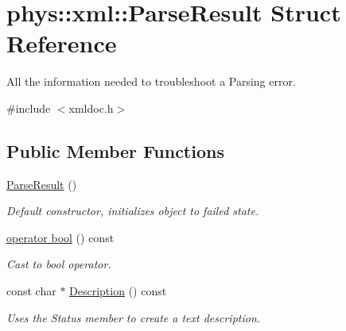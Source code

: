 \hypertarget{structphys_1_1xml_1_1ParseResult}{
\section{phys::xml::ParseResult Struct Reference}
\label{d5/dea/structphys_1_1xml_1_1ParseResult}
}


All the information needed to troubleshoot a Parsing error.  




{\ttfamily \#include $<$xmldoc.h$>$}

\subsection*{Public Member Functions}
\begin{DoxyCompactItemize}
\item 
\hypertarget{structphys_1_1xml_1_1ParseResult_aa7520df050e866122a0cf67bf306e323}{
\hyperlink{structphys_1_1xml_1_1ParseResult_aa7520df050e866122a0cf67bf306e323}{ParseResult} ()}
\label{d5/dea/structphys_1_1xml_1_1ParseResult_aa7520df050e866122a0cf67bf306e323}

\begin{DoxyCompactList}\small\item\em Default constructor, initializes object to failed state. \item\end{DoxyCompactList}\item 
\hyperlink{structphys_1_1xml_1_1ParseResult_a95c9989865c1bace7846995166a13e31}{operator bool} () const 
\begin{DoxyCompactList}\small\item\em Cast to bool operator. \item\end{DoxyCompactList}\item 
const char $\ast$ \hyperlink{structphys_1_1xml_1_1ParseResult_a7f31e89fbe1735e5092adfc352ae5a0d}{Description} () const 
\begin{DoxyCompactList}\small\item\em Uses the Status member to create a text description. \item\end{DoxyCompactList}\end{DoxyCompactItemize}

